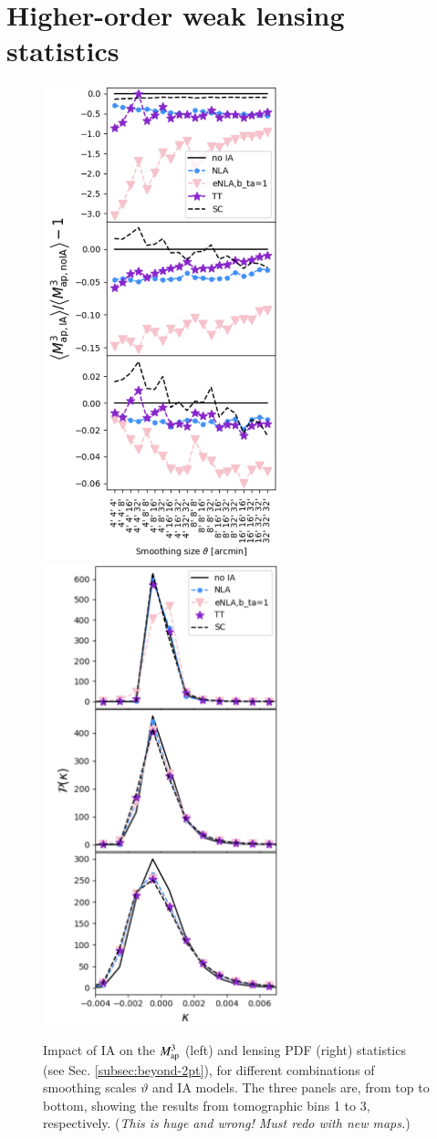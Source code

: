 \section{Higher-order weak lensing statistics}
\label{sec:HOWLS}

\begin{figure}
\includegraphics[width=2.7in]{graphs/Map3_IA}
\includegraphics[width=2.7in]{graphs/PDF_IA}
\caption{Impact of IA on the $M_{\rm ap}^3$ (left) and lensing PDF (right) statistics (see Sec. \ref{subsec:beyond-2pt}), for different combinations of smoothing scales $\vartheta$ and IA models. The three panels are, from top to bottom, showing the results from tomographic bins 1 to 3, respectively. ({\it This is huge and wrong! Must redo with new maps.})}
\label{fig:Map3_IA}
\end{figure}

